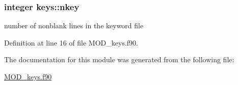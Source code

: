 \hypertarget{classkeys_a1568aa5defa6d3cd4617ed36cf50a39d}{
\subsubsection[{nkey}]{\setlength{\rightskip}{0pt plus 5cm}integer keys\-::nkey}}\label{classkeys_a1568aa5defa6d3cd4617ed36cf50a39d}


number of nonblank lines in the keyword file 



Definition at line 16 of file M\-O\-D\-\_\-keys.\-f90.



The documentation for this module was generated from the following file\-:\begin{DoxyCompactItemize}
\item 
\hyperlink{MOD__keys_8f90}{M\-O\-D\-\_\-keys.\-f90}\end{DoxyCompactItemize}
